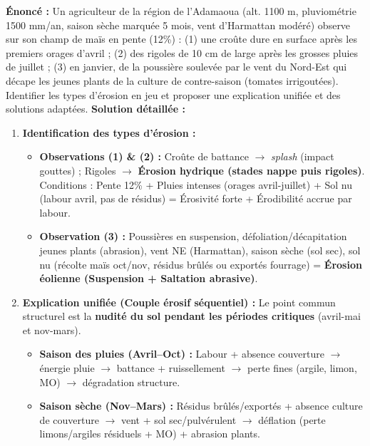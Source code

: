 \documentclass[11pt]{article}
\begin{document}
\begin{exoresolu}
\textbf{Énoncé :} Un agriculteur de la région de l'Adamaoua (alt. 1100 m, pluviométrie 1500 mm/an, saison sèche marquée 5 mois, vent d'Harmattan modéré) observe sur son champ de maïs en pente (12\%) : (1) une croûte dure en surface après les premiers orages d'avril ; (2) des rigoles de 10 cm de large après les grosses pluies de juillet ; (3) en janvier, de la poussière soulevée par le vent du Nord-Est qui décape les jeunes plants de la culture de contre-saison (tomates irrigoutées). Identifier les types d'érosion en jeu et proposer une explication unifiée et des solutions adaptées.
\textbf{Solution détaillée :}
\begin{enumerate}
    \item \textbf{Identification des types d'érosion :}
        \begin{itemize}
            \item \textbf{Observations (1) \& (2) :} Croûte de battance $\rightarrow$ \emph{splash} (impact gouttes) ; Rigoles $\rightarrow$ \textbf{Érosion hydrique (stades nappe puis rigoles)}. Conditions : Pente 12\% + Pluies intenses (orages avril-juillet) + Sol nu (labour avril, pas de résidus) = Érosivité forte + Érodibilité accrue par labour.
            \item \textbf{Observation (3) :} Poussières en suspension, défoliation/décapitation jeunes plants (abrasion), vent NE (Harmattan), saison sèche (sol sec), sol nu (récolte maïs oct/nov, résidus brûlés ou exportés fourrage) = \textbf{Érosion éolienne (Suspension + Saltation abrasive)}.
        \end{itemize}
    \item \textbf{Explication unifiée (Couple érosif séquentiel) :} Le point commun structurel est la \textbf{nudité du sol pendant les périodes critiques} (avril-mai et nov-mars).
        \begin{itemize}
            \item \textbf{Saison des pluies (Avril--Oct) :} Labour + absence couverture $\rightarrow$ énergie pluie $\rightarrow$ battance + ruissellement $\rightarrow$ perte fines (argile, limon, MO) $\rightarrow$ dégradation structure.
            \item \textbf{Saison sèche (Nov--Mars) :} Résidus brûlés/exportés + absence culture de couverture $\rightarrow$ vent + sol sec/pulvérulent $\rightarrow$ déflation (perte limons/argiles résiduels + MO) + abrasion plants.

\end{itemize}
\end{enumerate}
\end{exoresolu}
\end{document}
